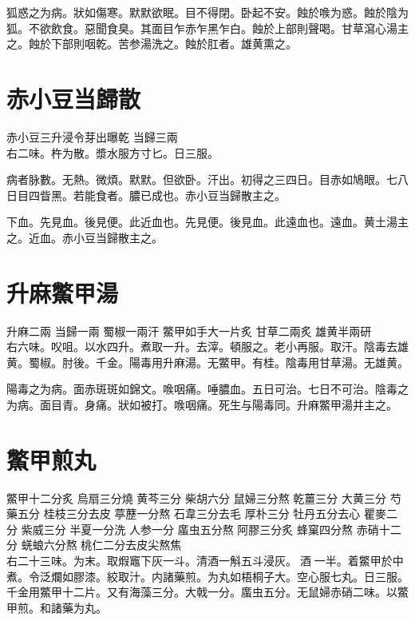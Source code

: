 狐惑之为病。狀如傷寒。默默欲眠。目不得閉。卧起不安。蝕於㗋为惑。蝕於陰为狐。不欲飲食。惡聞食臭。其面目乍赤乍黑乍白。蝕於上部則聲喝。甘草瀉心湯主之。蝕於下部則咽乾。苦参湯洗之。蝕於肛者。雄黄熏之。

\section{赤小豆当歸散}

赤小豆{\scriptsize 三升浸令芽出曝乾} 当歸{\scriptsize 三兩}\\
右二味。杵为散。漿水服方寸匕。日三服。

病者脉數。无熱。微煩。默默。但欲卧。汗出。初得之三四日。目赤如鳩眼。七八日目四眥黑。若能食者。膿已成也。赤小豆当歸散主之。

下血。先見血。後見便。此近血也。先見便。後見血。此遠血也。遠血。黄土湯主之。近血。赤小豆当歸散主之。

\section{升麻鱉甲湯}

升麻{\scriptsize 二兩} 当歸{\scriptsize 一兩} 蜀椒{\scriptsize 一兩汗} 鱉甲{\scriptsize 如手大一片炙} 甘草{\scriptsize 二兩炙} 雄黄{\scriptsize 半兩研}\\
右六味。㕮咀。以水四升。煮取一升。去滓。頓服之。老小再服。取汗。陰毒去雄黄。蜀椒。{\scriptsize 肘後。千金。陽毒用升麻湯。无鱉甲。有桂。陰毒用甘草湯。无雄黄。}

陽毒之为病。面赤斑斑如錦文。㗋咽痛。唾膿血。五日可治。七日不可治。陰毒之为病。面目青。身痛。狀如被打。㗋咽痛。死生与陽毒同。升麻鱉甲湯并主之。


\section{鱉甲煎丸}

鱉甲{\scriptsize 十二分炙} 烏扇{\scriptsize 三分燒} 黄芩{\scriptsize 三分} 柴胡{\scriptsize 六分} 鼠婦{\scriptsize 三分熬} 乾薑{\scriptsize 三分} 大黄{\scriptsize 三分} 芍藥{\scriptsize 五分} 桂枝{\scriptsize 三分去皮} 葶藶{\scriptsize 一分熬} 石韋{\scriptsize 三分去毛} 厚朴{\scriptsize 三分} 牡丹{\scriptsize 五分去心} 瞿麥{\scriptsize 二分} 紫威{\scriptsize 三分} 半夏{\scriptsize 一分洗} 人参{\scriptsize 一分} 䗪虫{\scriptsize 五分熬} 阿膠{\scriptsize 三分炙} 蜂窠{\scriptsize 四分熬} 赤硝{\scriptsize 十二分} 蜣蜋{\scriptsize 六分熬} 桃仁{\scriptsize 二分去皮尖熬焦}\\
右二十三味。为末。取煆竈下灰一斗。清酒一斛五斗浸灰。{\sungii 𠊱}酒{\sungii 𥁞}一半。着鱉甲於中煮。令泛爛如膠漆。絞取汁。内諸藥煎。为丸如梧桐子大。空心服七丸。日三服。{\scriptsize 千金用鱉甲十二片。又有海藻三分。大戟一分。䗪虫五分。无鼠婦赤硝二味。以鱉甲煎。和諸藥为丸。}

